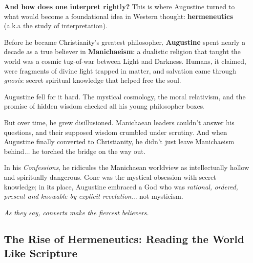 \textbf{And how does one interpret rightly?} This is where Augustine turned to what would become a foundational idea in Western thought: \textbf{hermeneutics} (a.k.a the study of interpretation).

\begin{tcolorbox}[
  colback=gray!5,
  colframe=black,
  title=\textbf{Historical Sidebar: Augustine’s Breakup with Manichaeism},
  fonttitle=\bfseries,
  width=\linewidth,
  enlarge left by=0mm,
  enlarge right by=0mm,
  boxrule=0.4pt,
  arc=2mm,
  left=4pt,
  right=4pt,
  top=6pt,
  bottom=6pt
]
Before he became Christianity’s greatest philosopher, \textbf{Augustine} spent nearly a decade as a true believer in \textbf{Manichaeism}: a dualistic religion that taught the world was a cosmic tug-of-war between Light and Darkness. Humans, it claimed, were fragments of divine light trapped in matter, and salvation came through \emph{gnosis}: secret spiritual knowledge that helped free the soul.

\medskip

Augustine fell for it hard. The mystical cosmology, the moral relativism, and the promise of hidden wisdom checked all his young philosopher boxes.

\medskip

But over time, he grew disillusioned. Manichaean leaders couldn’t answer his questions, and their supposed wisdom crumbled under scrutiny. And when Augustine finally converted to Christianity, he didn’t just leave Manichaeism behind... he torched the bridge on the way out.

\medskip

In his \emph{Confessions}, he ridicules the Manichaean worldview as intellectually hollow and spiritually dangerous. Gone was the mystical obsession with secret knowledge; in its place, Augustine embraced a God who was \emph{rational, ordered, present and knowable by explicit revelation}... not mysticism.

\medskip

\begin{center}
\emph{As they say, converts make the fiercest believers.}
\end{center}
\end{tcolorbox}


\subsection{The Rise of Hermeneutics: Reading the World Like Scripture}

